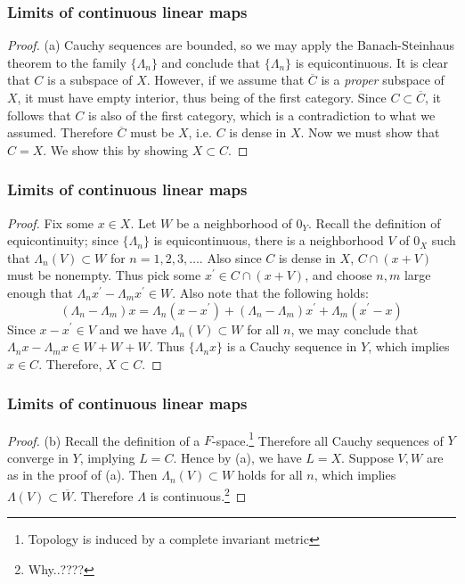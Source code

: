\documentclass{beamer}
\begin{document}
\begin{frame}
\frametitle{Limits of continuous linear maps}
\begin{proof}\renewcommand{\qedsymbol}{}
        (a) Cauchy sequences are bounded, so we may apply the Banach-Steinhaus theorem to the family $\{\Lambda_n\}$ and conclude that $\{\Lambda_n\}$ is equicontinuous. It is clear that $C$ is a subspace of $X$. However, if we assume that $\overline{C}$ is a \textit{proper} subspace of $X$, it must have empty interior, thus being of the first category. Since $C \subset \overline{C}$, it follows that $C$ is also of the first category, which is a contradiction to what we assumed. Therefore $\overline{C}$ must be $X$, i.e. $C$ is dense in $X$. Now we must show that $C=X$. We show this by showing $X \subset C$. 
\end{proof}
\end{frame}
\begin{frame}
\frametitle{Limits of continuous linear maps}
\begin{proof}
    Fix some $x \in X$. Let $W$ be a neighborhood of $0_Y$. Recall the definition of equicontinuity; since $\{\Lambda_n\}$ is equicontinuous, there is a neighborhood $V$ of $0_X$ such that $\Lambda_n(V)\subset W$ for $n = 1,2,3,\ldots$. Also since $C$ is dense in $X$, $C \cap (x+V)$ must be nonempty. Thus pick some $x^\prime \in C \cap (x+V)$, and choose $n,m$ large enough that $\Lambda_n x^\prime - \Lambda_m x^\prime \in W$. Also note that the following holds: \[(\Lambda_n - \Lambda_m)x = \Lambda_n(x-x^\prime) + (\Lambda_n-\Lambda_m)x^\prime + \Lambda_m(x^\prime-x)\] Since $x-x^\prime \in V$ and we have $\Lambda_n(V) \subset W$ for all $n$, we may conclude that $\Lambda_n x - \Lambda_m x \in W+W+W$. Thus $\{\Lambda_n x\}$ is a Cauchy sequence in $Y$, which implies $x \in C$. Therefore, $X \subset C$.
\end{proof}
\end{frame}
\begin{frame}
\frametitle{Limits of continuous linear maps}
\begin{proof}
    (b) Recall the definition of a $F$-space.\footnote{Topology is induced by a complete invariant metric} Therefore all Cauchy sequences of $Y$ converge in $Y$, implying $L = C$. Hence by (a), we have $L = X$. Suppose $V,W$ are as in the proof of (a). Then $\Lambda_n(V) \subset W$ holds for all $n$, which implies $\Lambda(V) \subset \overline{W}$. Therefore $\Lambda$ is continuous.\footnote{Why..????}
\end{proof}
\end{frame}
\end{document}
